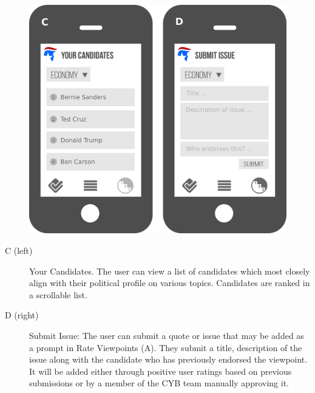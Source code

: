 \documentclass[11pt]{article}
\begin{document}
\begin{figure}[h]
    \includegraphics[width = \textwidth]{second.png}
\end{figure}

\begin{description}
    \item[C (left)] Your Candidates. The user can view a list of candidates which most closely align with their political profile on various topics. Candidates are ranked in a scrollable list.
    \item[D (right)] Submit Issue: The user can submit a quote or issue that may be added as a prompt in Rate Viewpoints (A). They submit a title, description of the issue along with the candidate who has previously endorsed the viewpoint. It will be added either through positive user ratings based on previous submissions or by a member of the CYB team manually approving it.
\end{description}
\end{document}
